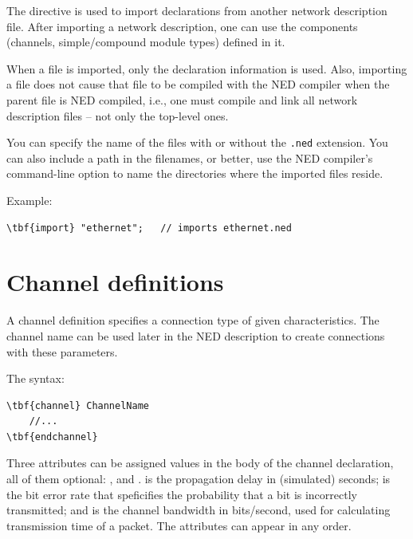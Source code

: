 
The  directive
is used to import declarations from another network description file.
After importing a network description, one can use the components
(channels, simple/compound module types) defined in it.

When a file is imported, only the declaration information is used.
Also, importing a  file does not cause that file to be compiled
with the NED compiler when the parent file is NED compiled, i.e.,
one must compile and link all network description files --
not only the top-level ones.

You can specify the name of the files with or without the
\texttt{.ned} extension. You can also include a path in the
filenames, or better, use the NED compiler's
 command-line option to name the directories where the
imported files reside.

Example:

\begin{Verbatim}[commandchars=\\\{\}]
\tbf{import} "ethernet";   // imports ethernet.ned
\end{Verbatim}




\section{Channel definitions}


A channel definition specifies a connection type of given characteristics.
The channel name can be used later in the NED description to
create connections with these parameters.

The syntax:

\begin{Verbatim}[commandchars=\\\{\}]
\tbf{channel} ChannelName
    //...
\tbf{endchannel}
\end{Verbatim}

Three attributes can be assigned values in the body of the channel declaration,
all of them optional: ,  and .
 is the propagation delay in (simulated) seconds;
 is the bit error rate that speficifies the probability
that a bit is incorrectly transmitted; and 
is the channel bandwidth in bits/second, used for calculating
transmission time of a packet. The attributes can appear
in any order.

